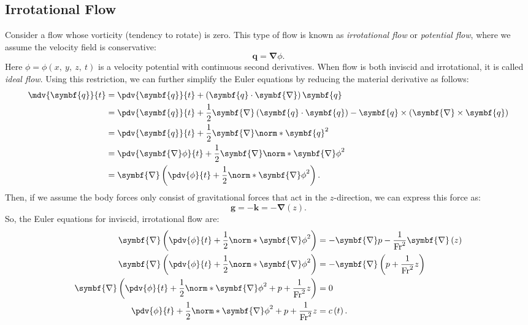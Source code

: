\documentclass{article}
\theoremstyle{definition}
\begin{document}
\subsection{Irrotational Flow}
Consider a flow whose vorticity (tendency to rotate) is zero. This type
of flow is known as \textit{irrotational flow} or \textit{potential
flow}, where we assume the velocity field is conservative:
\begin{equation*}
    \symbf{q} = \symbf{\nabla} \phi.
\end{equation*}
Here \(\phi = \phi\left( x,\: y,\: z,\: t \right)\) is a velocity
potential with continuous second derivatives. When flow is both
inviscid and irrotational, it is called \textit{ideal flow}. Using this
restriction, we can further simplify the Euler equations by reducing the
material derivative as follows:
\begin{align*}
    \mdv{\symbf{q}}{t} & = \pdv{\symbf{q}}{t} + \left( \symbf{q} \cdot \symbf{\nabla} \right) \symbf{q}                                                                               \\
                       & = \pdv{\symbf{q}}{t} + \frac{1}{2} \symbf{\nabla} \left( \symbf{q} \cdot \symbf{q} \right) - \symbf{q} \times \left( \symbf{\nabla} \times \symbf{q} \right) \\
                       & = \pdv{\symbf{q}}{t} + \frac{1}{2} \symbf{\nabla} \norm*{\symbf{q}}^2                                                                                        \\
                       & = \pdv{\symbf{\nabla} \phi}{t} + \frac{1}{2} \symbf{\nabla} \norm*{\symbf{\nabla} \phi}^2                                                                    \\
                       & = \symbf{\nabla} \left( \pdv{\phi}{t} + \frac{1}{2} \norm*{\symbf{\nabla} \phi}^2 \right).
\end{align*}
Then, if we assume the body forces only consist of gravitational forces
that act in the \(z\)-direction, we can express this force as:
\begin{equation*}
    \symbf{g} = -\symbf{k} = -\symbf{\nabla} \left( z \right).
\end{equation*}
So, the Euler equations for inviscid, irrotational flow are:
\begin{align*}
    \symbf{\nabla} \left( \pdv{\phi}{t} + \frac{1}{2} \norm*{\symbf{\nabla} \phi}^2 \right)                                 & = -\symbf{\nabla} p - \frac{1}{\mathrm{Fr}^2} \symbf{\nabla} \left( z \right) \\
    \symbf{\nabla} \left( \pdv{\phi}{t} + \frac{1}{2} \norm*{\symbf{\nabla} \phi}^2 \right)                                 & = -\symbf{\nabla} \left( p + \frac{1}{\mathrm{Fr}^2} z \right)                \\
    \symbf{\nabla} \left( \pdv{\phi}{t} + \frac{1}{2} \norm*{\symbf{\nabla} \phi}^2 + p + \frac{1}{\mathrm{Fr}^2} z \right) & = 0                                                                           \\
    \pdv{\phi}{t} + \frac{1}{2} \norm*{\symbf{\nabla} \phi}^2 + p + \frac{1}{\mathrm{Fr}^2} z                               & = c\left( t \right).
\end{align*}
\end{document}
